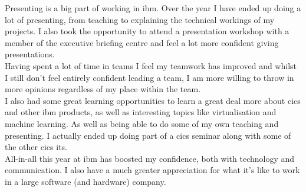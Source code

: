 \documentclass[a4paper,11pt]{report}
\begin{document}
Presenting is a big part of working in \gls{ibm}. Over the year I have ended up doing a lot of 
presenting, from teaching to explaining the technical workings of my projects. I also took the
opportunity to attend a presentation workshop with a member of the executive briefing centre and
feel a lot more confident giving presentations. \\

Having spent a lot of time in teams I feel my teamwork has improved and whilst I still don't feel
entirely confident leading a team, I am more willing to throw in more opinions regardless of my
place within the team. \\

I also had some great learning opportunities to learn a great deal more about \gls{cics} and other
\gls{ibm} products, as well as interesting topics like virtualisation and machine learning. As well
as being able to do some of my own teaching and presenting. I actually ended up doing part of a
\gls{cics} seminar along with some of the other \gls{cics} \gls{it}s. \\

All-in-all this year at \gls{ibm} has boosted my confidence, both with technology and 
communication. I also have a much greater appreciation for what it's like to work in a large 
software (and hardware) company.
\end{document}

